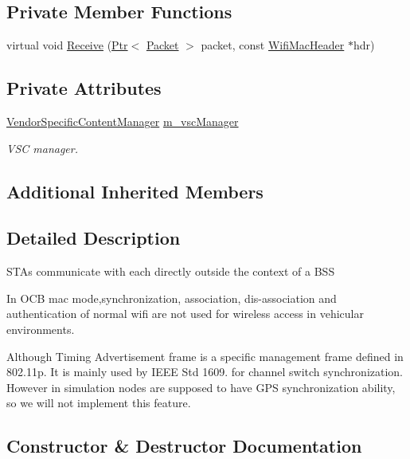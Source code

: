 \subsection*{Private Member Functions}
\begin{DoxyCompactItemize}
\item 
virtual void \hyperlink{classns3_1_1OcbWifiMac_ad025b0fd981998bf3c527a9c4a719962}{Receive} (\hyperlink{classns3_1_1Ptr}{Ptr}$<$ \hyperlink{classns3_1_1Packet}{Packet} $>$ packet, const \hyperlink{classns3_1_1WifiMacHeader}{Wifi\+Mac\+Header} $\ast$hdr)
\end{DoxyCompactItemize}
\subsection*{Private Attributes}
\begin{DoxyCompactItemize}
\item 
\hyperlink{classns3_1_1VendorSpecificContentManager}{Vendor\+Specific\+Content\+Manager} \hyperlink{classns3_1_1OcbWifiMac_a6fa7d29070a49c08fb2297cba61b3a90}{m\+\_\+vsc\+Manager}
\begin{DoxyCompactList}\small\item\em V\+SC manager. \end{DoxyCompactList}\end{DoxyCompactItemize}
\subsection*{Additional Inherited Members}


\subsection{Detailed Description}
S\+T\+As communicate with each directly outside the context of a B\+SS

In O\+CB mac mode,synchronization, association, dis-\/association and authentication of normal wifi are not used for wireless access in vehicular environments. 

Although Timing Advertisement frame is a specific management frame defined in 802.\+11p. It is mainly used by I\+E\+EE Std 1609. for channel switch synchronization. However in simulation nodes are supposed to have G\+PS synchronization ability, so we will not implement this feature. 

\subsection{Constructor \& Destructor Documentation}

